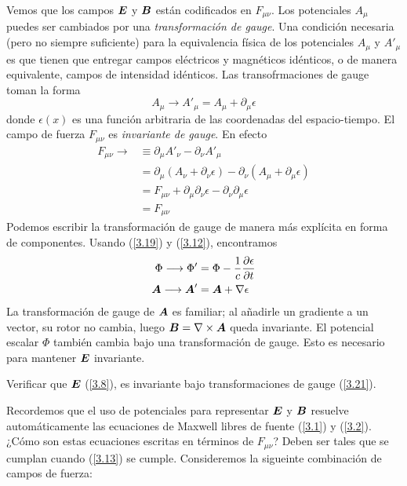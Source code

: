 Vemos que los campos $\vb*{E}$ y $\vb*{B}$ están codificados en $F_{\mu\nu}$. Los potenciales $A_\mu$ puedes ser cambiados por una \textit{transformación de gauge}. Una condición necesaria (pero no siempre suficiente) para la equivalencia física de los potenciales $A_\mu$ y $A'_\mu$ es que tienen que entregar campos eléctricos y magnéticos idénticos, o de manera equivalente, campos de intensidad idénticos. Las transofrmaciones de gauge toman la forma
\begin{equation}
    A_\mu\longrightarrow A'_\mu=A_\mu+\partial_\mu\epsilon
\end{equation}
donde $\epsilon(x)$ es una función arbitraria de las coordenadas del espacio-tiempo. El campo de fuerza $F_{\mu\nu}$ es \textit{invariante de gauge}. En efecto
\begin{equation}\label{3.20}
\begin{split}
    F_{\mu\nu}\longrightarrow&\equiv \partial_\mu A'_\nu-\partial_\nu A'_\mu\\
    &=\partial_\mu (A_\nu+\partial_\nu \epsilon)-\partial_\nu(A_\mu+\partial_\mu \epsilon)\\
    &=F_{\mu\nu}+\partial_\mu\partial_\nu\epsilon-\partial_\nu\partial_\mu \epsilon\\
    &=F_{\mu\nu}
    \end{split}
\end{equation}
Podemos escribir la transformación de gauge de manera más explícita en forma de componentes. Usando (\ref{3.19}) y (\ref{3.12}), encontramos
\begin{equation}\label{3.21}
    \begin{split}
        \Phi\longrightarrow \Phi'&=\Phi-\frac{1}{c}\pdv{\epsilon}{t}\\
        \vb*{A}\longrightarrow \vb*{A}'&=\vb*{A}+\nabla\epsilon
    \end{split}
\end{equation}
La transformación de gauge de $\vb*{A}$ es familiar; al añadirle un gradiente a un vector, su rotor no cambia, luego $\vb*{B}=\nabla\times\vb*{A}$ queda invariante. El potencial escalar $\Phi$ también cambia bajo una transformación de gauge. Esto es necesario para mantener $\vb*{E}$ invariante.
\begin{tcolorbox}
    Verificar que $\vb*{E}$ (\ref{3.8}), es invariante bajo transformaciones de gauge (\ref{3.21}).
\end{tcolorbox}
Recordemos que el uso de potenciales para representar $\vb*{E}$ y $\vb*{B}$ resuelve automáticamente las ecuaciones de Maxwell libres de fuente (\ref{3.1}) y (\ref{3.2}). ¿Cómo son estas ecuaciones escritas en términos de $F_{\mu\nu}$? Deben ser tales que se cumplan cuando (\ref{3.13}) se cumple. Consideremos la sigueinte combinación de campos de fuerza:
